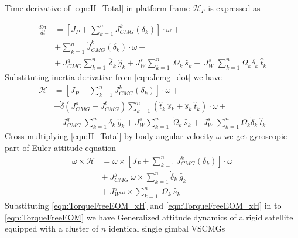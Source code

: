 Time derivative of \autoref{eqn:H_Total} in platform frame $\mathcal{H}_P$ is expressed as

\begin{equation}
\begin{aligned}
\frac{d\mathcal{H}}{dt} & =\left[ J_{P} +\sum ^{n}_{k=1} J^{k}_{CMG}( \delta_{k})\right] \cdotp \dot{\omega } +\\
 & +\sum ^{n}_{k=1}\dot{J}^{k}_{CMG}( \delta_{k}) \cdotp \omega +\\
 & +\ J^{g}_{CMG}\sum ^{n}_{k=1} \ \ddot{\delta}_{k} \ \hat{g}_{k} +J^{s}_{W}\sum ^{n}_{k=1} \ \dot{\Omega }_{k} \ \hat{s}_{k} +\ J^{s}_{W} \ \sum ^{n}_{k=1} \Omega _{k}\dot{\delta}_{k} \ \hat{t}_{k}
\end{aligned}
\end{equation}Substituting inertia derivative from \autoref{eqn:Jcmg_dot} we have
\begin{equation}
\begin{aligned}
\dot{\mathcal{H}} & =\left[ J_{P} +\sum ^{n}_{k=1} J^{k}_{CMG}( \delta_{k})\right] \cdotp \dot{\omega } +\\
 & +\dot{\delta}\left( J^{s}_{CMG} -J^{t}_{CMG}\right)\sum ^{n}_{k=1}(\hat{t}_{k} \ \hat{s}_{k} +\hat{s}_{k} \ \hat{t}_{k}) \cdotp \omega +\\
 & +\ J^{g}_{CMG} \ \sum ^{n}_{k=1}\ddot{\delta}_{k} \ \hat{g}_{k} +J^{s}_{W}\sum ^{n}_{k=1} \ \dot{\Omega }_{k} \ \hat{s}_{k} +\ J^{s}_{W} \ \sum ^{n}_{k=1} \Omega _{k}\dot{\delta}_{k} \ \hat{t}_{k}
\end{aligned}
\label{eqn:TorqueFreeEOM_H}
\end{equation}
Cross multiplying \autoref{eqn:H_Total} by body angular velocity $\omega$ we get gyroscopic part of Euler attitude equation
\begin{equation}
\begin{aligned}
\omega \times \mathcal{H} & =\omega \times \left[ J_{P} +\sum ^{n}_{k=1} J^{k}_{CMG}( \delta_{k})\right] \cdotp \omega \\
 & +\ J^{g}_{CMG} \ \omega \times \sum ^{n}_{k=1}\dot{\delta}_{k} \ \hat{g}_{k}\\
 & +\ J^{s}_{W} \omega \times \sum ^{n}_{k=1} \ \Omega _{k} \ \hat{s}_{k}
\end{aligned}
\label{eqn:TorqueFreeEOM_xH}
\end{equation}
Substituting \autoref{eqn:TorqueFreeEOM_xH} and \autoref{eqn:TorqueFreeEOM_xH} in to \autoref{eqn:TorqueFreeEOM} we have Generalized attitude dynamics of a rigid satellite equipped with a cluster of $\displaystyle n$ identical single gimbal VSCMGs


